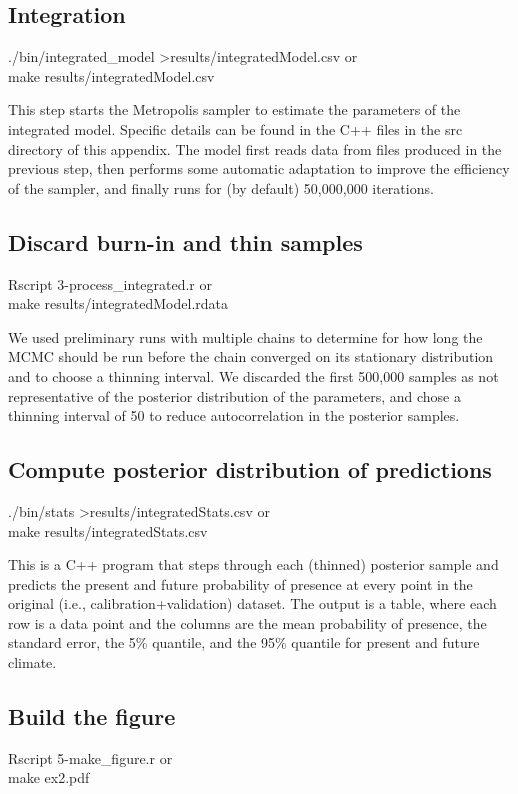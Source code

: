 \documentclass[11pt]{article}
\newcommand{\code}[1]{\colorbox{light-gray}{\ttfamily #1}}
\begin{document}
\subsection{Integration}
\code{./bin/integrated\_model >results/integratedModel.csv} or \\
\code{make results/integratedModel.csv}

This step starts the Metropolis sampler to estimate the parameters of the integrated model. 
Specific details can be found in the C++ files in the src directory of this appendix.
The model first reads data from files produced in the previous step, then performs some automatic adaptation to improve the efficiency of the sampler, and finally runs for (by default) 50,000,000 iterations.

\subsection{Discard burn-in and thin samples}
\code{Rscript 3-process\_integrated.r} or \\
\code{make results/integratedModel.rdata}

We used preliminary runs with multiple chains to determine for how long the MCMC should be run before the chain converged on its stationary distribution and to choose a thinning interval.
We discarded the first 500,000 samples as not representative of the posterior distribution of the parameters, and chose a thinning interval of 50 to reduce autocorrelation in the posterior samples.

\subsection{Compute posterior distribution of predictions}
\code{./bin/stats >results/integratedStats.csv} or \\
\code{make results/integratedStats.csv}

This is a C++ program that steps through each (thinned) posterior sample and predicts the present and future probability of presence at every point in the original (i.e., calibration+validation) dataset.
The output is a table, where each row is a data point and the columns are the mean probability of presence, the standard error, the 5\% quantile, and the 95\% quantile for present and future climate.

\subsection{Build the figure}
\code{Rscript 5-make\_figure.r} or \\
\code{make ex2.pdf}
\end{document}
